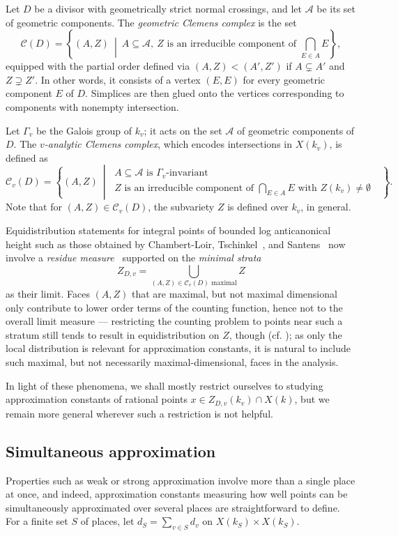 \documentclass[a4paper, twoside, 11pt]{amsart}
\theoremstyle{definition}
\newcommand{\cA}{\mathcal{A}}
\newcommand{\cC}{\mathcal{C}}
\begin{document}
Let $D$ be a divisor with geometrically strict normal crossings, and let $\cA$ be its set of geometric components. The \emph{geometric Clemens complex} is the set
\begin{equation*}
	\cC(D) = \left\{(A, Z)\ \middle|\ A\subseteq \cA,\ \text{$Z$ is an irreducible component of $\bigcap_{E\in A} E$} \right\},
\end{equation*}
equipped with the partial order defined via $(A,Z)< (A',Z')$ if $A\subsetneq A'$ and $Z\supsetneq Z'$.
In other words, it consists of a vertex $(E,E)$ for every geometric component $E$ of $D$. Simplices are then glued onto the vertices corresponding to components with nonempty intersection.

Let $\Gamma_v$ be the Galois group of $k_v$; it acts on the set $\cA$ of geometric components of $D$.
 The \emph{$v$-analytic Clemens complex}, which encodes intersections in $X(k_v)$, is defined as
\begin{equation*}
	\cC_v(D) = \left\{(A, Z)\ \middle|\ \substack{A\subseteq \cA \text{ is $\Gamma_v$-invariant}\\ \text{$Z$ is an irreducible component of $\bigcap_{E\in A} E$ with $Z(k_v)\ne \emptyset$ }} \right\}.
\end{equation*}
Note that for $(A,Z)\in \cC_v(D)$, the subvariety $Z$ is defined over $k_v$, in general.

Equidistribution statements for integral points of bounded log anticanonical height such as those obtained by Chambert-Loir, Tschinkel~\cite{clt-vector}, and Santens~\cite{Santens} now involve a \emph{residue measure}~\cite[\S\,2.1]{C-L-Tsch} supported on the \emph{minimal strata}
\[
	Z_{D,v} = \bigcup_{(A,Z)\in \cC_v(D) \text{ maximal}} Z
\]
as their limit.
Faces $(A, Z)$ that are maximal, but not maximal dimensional only contribute to lower order terms of the counting function, hence not to the overall limit measure --- restricting the counting problem to points near such a stratum still tends to result in equidistribution on $Z$, though (cf. \cite[p.~3]{Santens}); as only the local distribution is relevant for approximation constants, it is natural to include such maximal, but not necessarily maximal-dimensional, faces in the analysis.

In light of these phenomena, we shall mostly restrict ourselves to studying approximation constants of rational points $x\in Z_{D,v}(k_v)\cap X(k)$, but we remain more general wherever such a restriction is not helpful.

\subsection{Simultaneous approximation}
Properties such as weak or strong approximation involve more than a single place at once, and indeed, approximation constants measuring how well points can be simultaneously approximated over several places are straightforward to define. For a finite set $S$ of places, let $d_S = \sum_{v\in S} d_v$ on
$X(k_S)\times X(k_S)$. 
\end{document}
